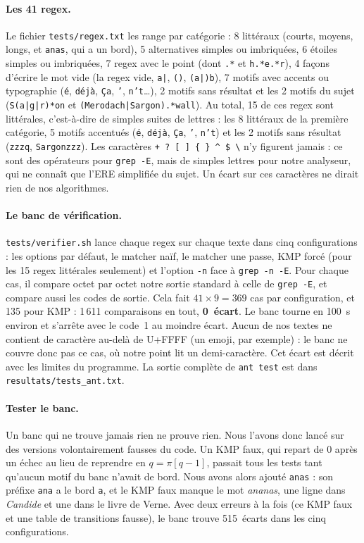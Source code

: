 \paragraph{Les 41 regex.}
Le fichier \texttt{tests/regex.txt} les range par catégorie : 8 littéraux
(courts, moyens, longs, et \texttt{anas}, qui a un bord), 5 alternatives
simples ou imbriquées, 6 étoiles simples ou imbriquées, 7 regex avec le
point (dont \texttt{.*} et \texttt{h.*e.*r}), 4 façons d'écrire le mot vide
(la regex vide, \texttt{a|}, \texttt{()}, \texttt{(a|)b}), 7 motifs avec
accents ou typographie (\texttt{é}, \texttt{déjà}, \texttt{Ça}, \texttt{’},
\texttt{n’t}\ldots), 2 motifs sans résultat et les 2 motifs du sujet
(\texttt{S(a|g|r)*on} et \texttt{(Merodach|Sargon).*wall}). Au total,
15 de ces regex sont littérales, c'est-à-dire de simples suites de
lettres : les 8 littéraux de la première catégorie, 5 motifs accentués
(\texttt{é}, \texttt{déjà}, \texttt{Ça}, \texttt{’}, \texttt{n’t}) et les
2 motifs sans résultat (\texttt{zzzq}, \texttt{Sargonzzz}). Les caractères
\texttt{+ ? [ ] \{ \} \^{} \$ \textbackslash} n'y figurent jamais : ce
sont des opérateurs pour \texttt{grep -E}, mais de simples lettres pour
notre analyseur, qui ne connaît que l'ERE simplifiée du sujet. Un écart
sur ces caractères ne dirait rien de nos algorithmes.

\paragraph{Le banc de vérification.}
\texttt{tests/verifier.sh} lance chaque regex sur chaque texte dans cinq
configurations : les options par défaut, le matcher naïf, le matcher une
passe, KMP forcé (pour les 15 regex littérales seulement) et l'option
\texttt{-n} face à \texttt{grep -n -E}. Pour chaque cas, il compare
octet par octet notre sortie standard à celle de \texttt{grep -E}, et
compare aussi les codes de sortie. Cela fait $41 \times 9 = 369$ cas par
configuration, et 135 pour KMP : 1\,611 comparaisons en tout,
\textbf{0~écart}. Le banc tourne en 100~s environ et s'arrête avec le code~1
au moindre écart. Aucun de nos textes ne contient de caractère au-delà de
U+FFFF (un emoji, par exemple) : le banc ne couvre donc pas ce cas, où
notre point lit un demi-caractère. Cet écart est décrit avec les limites
du programme. La sortie complète de \texttt{ant test} est dans
\texttt{resultats/tests\_ant.txt}.

\paragraph{Tester le banc.}
Un banc qui ne trouve jamais rien ne prouve rien. Nous l'avons donc
lancé sur des versions volontairement fausses du code. Un KMP faux, qui
repart de 0 après un échec au lieu de reprendre en $q = \pi[q-1]$,
passait tous les tests tant qu'aucun motif du banc n'avait de bord.
Nous avons alors ajouté \texttt{anas} : son préfixe \texttt{ana} a le
bord \texttt{a}, et le KMP faux manque le mot \emph{ananas}, une ligne
dans \emph{Candide} et une dans le livre de Verne. Avec deux erreurs à la
fois (ce KMP faux et une table de transitions fausse), le banc trouve
515~écarts dans les cinq configurations.

